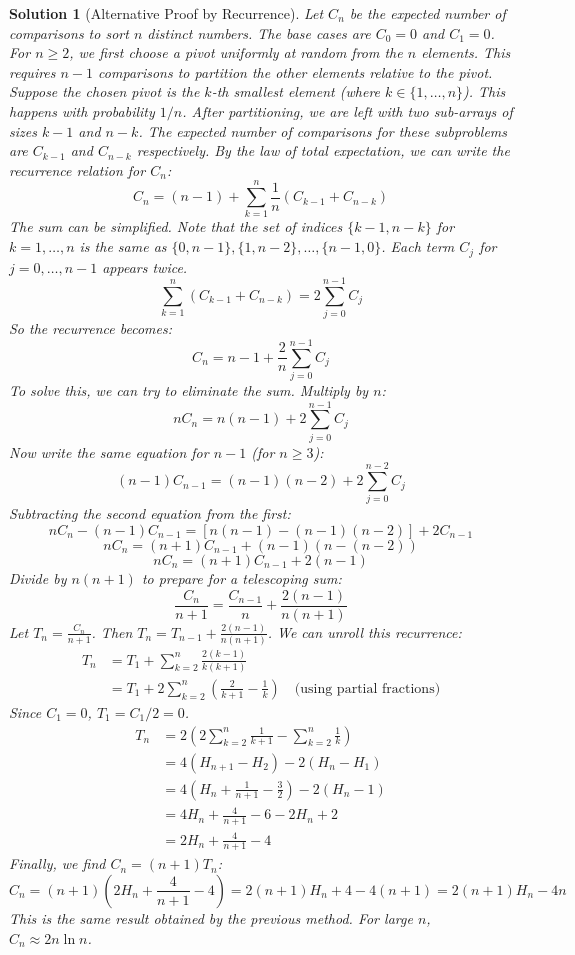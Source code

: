 \documentclass[12pt]{amsart}
\newtheorem*{solution}{Solution}
\begin{document}
\begin{solution}[Alternative Proof by Recurrence]
Let $C_n$ be the expected number of comparisons to sort $n$ distinct numbers. The base cases are $C_0=0$ and $C_1=0$.
For $n \ge 2$, we first choose a pivot uniformly at random from the $n$ elements. This requires $n-1$ comparisons to partition the other elements relative to the pivot.
Suppose the chosen pivot is the $k$-th smallest element (where $k \in \{1, \ldots, n\}$). This happens with probability $1/n$. After partitioning, we are left with two sub-arrays of sizes $k-1$ and $n-k$. The expected number of comparisons for these subproblems are $C_{k-1}$ and $C_{n-k}$ respectively.
By the law of total expectation, we can write the recurrence relation for $C_n$:
$$ C_n = (n-1) + \sum_{k=1}^n \frac{1}{n} (C_{k-1} + C_{n-k}) $$
The sum can be simplified. Note that the set of indices $\{k-1, n-k\}$ for $k=1, \ldots, n$ is the same as $\{0, n-1\}, \{1, n-2\}, \ldots, \{n-1, 0\}$. Each term $C_j$ for $j=0, \ldots, n-1$ appears twice.
$$ \sum_{k=1}^n (C_{k-1} + C_{n-k}) = 2 \sum_{j=0}^{n-1} C_j $$
So the recurrence becomes:
$$ C_n = n-1 + \frac{2}{n} \sum_{j=0}^{n-1} C_j $$
To solve this, we can try to eliminate the sum. Multiply by $n$:
$$ nC_n = n(n-1) + 2 \sum_{j=0}^{n-1} C_j $$
Now write the same equation for $n-1$ (for $n \ge 3$):
$$ (n-1)C_{n-1} = (n-1)(n-2) + 2 \sum_{j=0}^{n-2} C_j $$
Subtracting the second equation from the first:
$$ nC_n - (n-1)C_{n-1} = [n(n-1) - (n-1)(n-2)] + 2C_{n-1} $$
$$ nC_n = (n+1)C_{n-1} + (n-1)(n - (n-2)) $$
$$ nC_n = (n+1)C_{n-1} + 2(n-1) $$
Divide by $n(n+1)$ to prepare for a telescoping sum:
$$ \frac{C_n}{n+1} = \frac{C_{n-1}}{n} + \frac{2(n-1)}{n(n+1)} $$
Let $T_n = \frac{C_n}{n+1}$. Then $T_n = T_{n-1} + \frac{2(n-1)}{n(n+1)}$. We can unroll this recurrence:
\begin{align*}
T_n &= T_1 + \sum_{k=2}^n \frac{2(k-1)}{k(k+1)} \\
&= T_1 + 2 \sum_{k=2}^n \left( \frac{2}{k+1} - \frac{1}{k} \right) \quad \text{(using partial fractions)}
\end{align*}
Since $C_1=0$, $T_1 = C_1/2 = 0$.
\begin{align*}
T_n &= 2 \left( 2\sum_{k=2}^n \frac{1}{k+1} - \sum_{k=2}^n \frac{1}{k} \right) \\
&= 4(H_{n+1} - H_2) - 2(H_n - H_1) \\
&= 4(H_n + \frac{1}{n+1} - \frac{3}{2}) - 2(H_n - 1) \\
&= 4H_n + \frac{4}{n+1} - 6 - 2H_n + 2 \\
&= 2H_n + \frac{4}{n+1} - 4
\end{align*}
Finally, we find $C_n = (n+1)T_n$:
$$ C_n = (n+1)\left(2H_n + \frac{4}{n+1} - 4\right) = 2(n+1)H_n + 4 - 4(n+1) = 2(n+1)H_n - 4n $$
This is the same result obtained by the previous method. For large $n$, $C_n \approx 2n \ln n$.
\end{solution}
\end{document}
